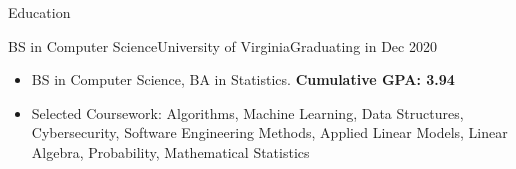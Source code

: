 \documentclass[]{mcdowellcv}
\begin{document}
\makeheader
      

\begin{cvsection}{Education}
	\begin{cvsubsection}{BS in Computer Science}{University of Virginia}{Graduating in Dec 2020}
		\begin{itemize}
			\item BS in Computer Science, BA in Statistics. \textbf{Cumulative GPA: 3.94}
			\item Selected Coursework: Algorithms, Machine Learning, Data Structures, Cybersecurity, Software Engineering Methods, Applied Linear Models, Linear Algebra, Probability, Mathematical Statistics 
		\end{itemize}
	\end{cvsubsection}
\end{cvsection}
\end{document}
